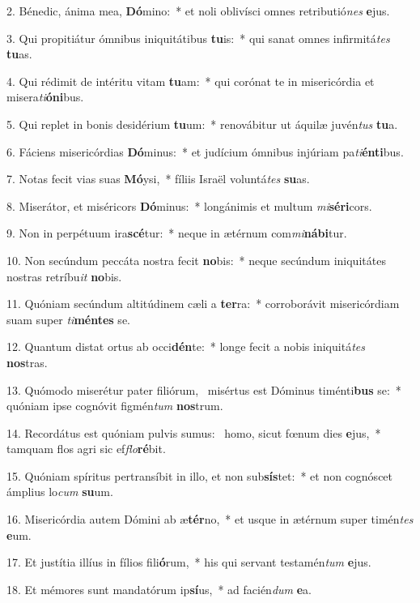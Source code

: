2. Bénedic, ánima mea, \textbf{Dó}mino:~*  et noli oblivísci omnes retributió\textit{nes} \textbf{e}jus.\

3. Qui propitiátur ómnibus iniquitátibus \textbf{tu}is:~*  qui sanat omnes infirmitá\textit{tes} \textbf{tu}as.\

4. Qui rédimit de intéritu vitam \textbf{tu}am:~*  qui corónat te in misericórdia et misera\textit{ti}\textbf{ó}\textbf{ni}bus.\

5. Qui replet in bonis desidérium \textbf{tu}um:~*  renovábitur ut áquilæ juvén\textit{tus} \textbf{tu}a.\

6. Fáciens misericórdias \textbf{Dó}minus:~*  et judícium ómnibus injúriam pa\textit{ti}\textbf{én}\textbf{ti}bus.\

7. Notas fecit vias suas \textbf{Mó}ysi,~*  fíliis Israël voluntá\textit{tes} \textbf{su}as.\

8. Miserátor, et miséricors \textbf{Dó}minus:~*  longánimis et multum \textit{mi}\textbf{sé}\textbf{ri}cors.\

9. Non in perpétuum ira\textbf{scé}tur:~*  neque in ætérnum com\textit{mi}\textbf{ná}\textbf{bi}tur.\

10. Non secúndum peccáta nostra fecit \textbf{no}bis:~*  neque secúndum iniquitátes nostras retríbu\textit{it} \textbf{no}bis.\

11. Quóniam secúndum altitúdinem cæli a \textbf{ter}ra:~*  corroborávit misericórdiam suam super \textit{ti}\textbf{mén}\textbf{tes} se.\

12. Quantum distat ortus ab occi\textbf{dén}te:~*  longe fecit a nobis iniquitá\textit{tes} \textbf{nos}tras.\

13. Quómodo miserétur pater filiórum, \dag\  misértus est Dóminus timénti\textbf{bus} se:~*  quóniam ipse cognóvit figmén\textit{tum} \textbf{nos}trum.\

14. Recordátus est quóniam pulvis sumus: \dag\  homo, sicut fœnum dies \textbf{e}jus,~*  tamquam flos agri sic ef\textit{flo}\textbf{ré}bit.\

15. Quóniam spíritus pertransíbit in illo, et non sub\textbf{sís}tet:~*  et non cognóscet ámplius lo\textit{cum} \textbf{su}um.\

16. Misericórdia autem Dómini ab æ\textbf{tér}no,~*  et usque in ætérnum super timén\textit{tes} \textbf{e}um.\

17. Et justítia illíus in fílios fili\textbf{ó}rum,~*  his qui servant testamén\textit{tum} \textbf{e}jus.\

18. Et mémores sunt mandatórum ip\textbf{sí}us,~*  ad facién\textit{dum} \textbf{e}a.\

